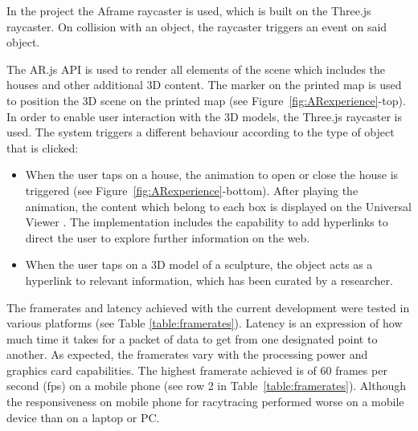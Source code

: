 \documentclass[acmlarge,screen,dvipsnames]{acmart}
\begin{document}
In the project the Aframe raycaster is used, which is built
on the Three.js raycaster. On collision with an object, the raycaster triggers
an event on said object. 

The AR.js API is used to render all elements of the scene which includes the
houses and other additional 3D content. The marker on the printed map is used
to position the 3D scene on the printed map (see
Figure~\ref{fig:ARexperience}-top). In order to enable user interaction with
the 3D models, the Three.js raycaster is used. The system triggers a different
behaviour according to the type of object that is clicked: 

\begin{itemize}
\item When the user taps on a house, the animation to open or close the house
is triggered (see Figure~\ref{fig:ARexperience}-bottom). After playing the
animation, the content which belong to each box is displayed on the Universal
Viewer \cite{uv}. The implementation includes the capability to add hyperlinks
to direct the user to explore further information on the web. 
\item When the
user taps on a 3D model of a sculpture, the object acts as a hyperlink to
relevant information, which has been curated by a researcher.  
\end{itemize}


The framerates and latency achieved with the current development were tested
in various platforms (see Table \ref{table:framerates}). Latency is an
expression of how much time it takes for a packet of data to get from one
designated point to another. As expected, the framerates vary with the
processing power and graphics card capabilities. The highest framerate
achieved is of 60 frames per second (fps) on a mobile phone (see row 2 in
Table~\ref{table:framerates}). Although the responsiveness on mobile phone for
racytracing performed worse on a mobile device than on a laptop or PC.
\end{document}
